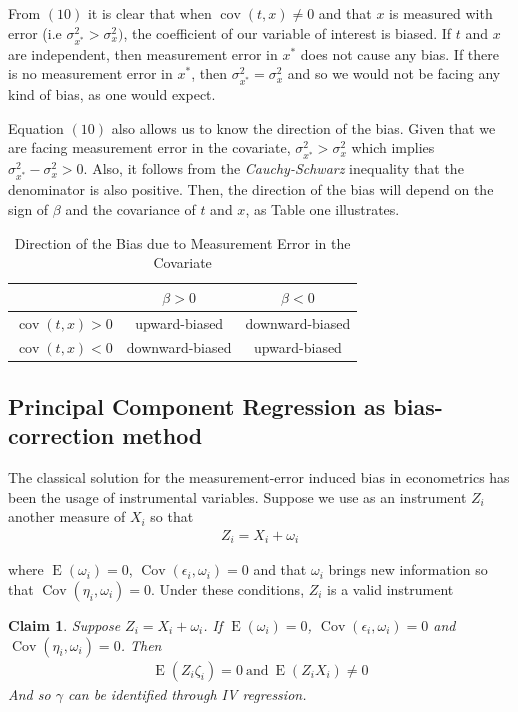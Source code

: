 \documentclass[10pt]{article}
\newtheorem{claim}{Claim}
\def\b{\beta}
\begin{document}
       From $(10)$ it is clear that when $\operatorname{cov}(t,x)\neq 0$ and that $x$ is measured with error (i.e $\sigma_{x^*}^2>\sigma_x^2)$, the coefficient of our variable of interest is biased. If $t$ and $x$ are independent, then measurement error in $x^*$ does not cause any bias. If there is no measurement error in $x^*$, then $\sigma^2_{x^*}=\sigma^2_x$ and so we would not be facing any kind of bias, as one would expect.
        
        Equation $(10)$ also allows us to know the direction of the bias. Given that we are facing measurement error in the covariate, $\sigma^2_{x^*}>\sigma^2_x$ which implies $\sigma^2_{x^*}-\sigma^2_x>0$. Also, it follows from the \textit{Cauchy-Schwarz} inequality that the denominator is also positive. Then, the direction of the bias will depend on the sign of $\beta$ and the covariance of $t$ and $x$, as Table one illustrates.
        
        \begin{table}[H]
            \centering
            \begin{tabular}{|c|c|c|}\hline \hline
              & $\b>0$  & $\b<0$ \\ \hline
             $\operatorname{cov}(t,x)>0$ & upward-biased & downward-biased \\ \hline
             $\operatorname{cov}(t,x)<0$ & downward-biased & upward-biased \\ \hline
            \end{tabular} 
            \caption{Direction of the Bias due to Measurement Error in the Covariate}
            \label{tab:my_label}
        \end{table}
        
         
        \subsection*{Principal Component Regression as bias-correction method}
        
        The classical solution for the measurement-error induced bias in econometrics has been the usage of instrumental variables. Suppose we use as an instrument $Z_i$ another measure of $X_i$ so that
        \begin{align}
            Z_i=X_i+\omega_i
        \end{align}
        
        where $\operatorname{E}(\omega_i)=0$, $\operatorname{Cov}(\epsilon_i,\omega_i)=0$ and that $\omega_i$ brings new information so that $\operatorname{Cov}(\eta_i,\omega_i)=0$.  Under these conditions, $Z_i$ is a valid instrument
\begin{claim}
Suppose $ Z_i=X_i+\omega_i$. If $\operatorname{E}(\omega_i)=0$, $\operatorname{Cov}(\epsilon_i,\omega_i)=0$ and $\operatorname{Cov}(\eta_i,\omega_i)=0$. Then
\begin{align}
\operatorname{E}(Z_i\zeta_i)=0 \ \text{and} \  \operatorname{E}(Z_iX_i)\neq0
\end{align}
And so $\gamma$ can be identified through IV regression.
\end{claim}
\end{document}

